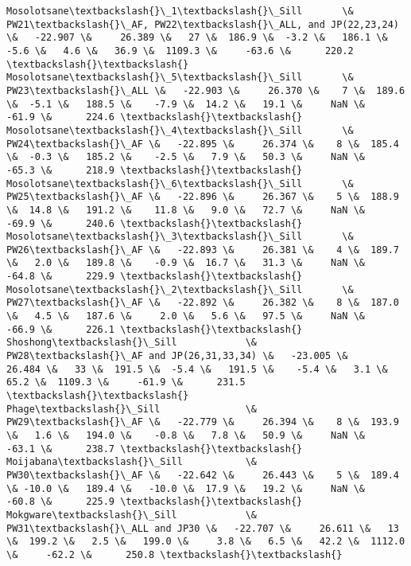 \documentclass{article}
\begin{document}
\begin{Verbatim}[commandchars=\\\{\}]
Mosolotsane\textbackslash{}\_1\textbackslash{}\_Sill       \&  PW21\textbackslash{}\_AF, PW22\textbackslash{}\_ALL, and JP(22,23,24) \&   -22.907 \&     26.389 \&   27 \&  186.9 \&  -3.2 \&   186.1 \&    -5.6 \&   4.6 \&   36.9 \&  1109.3 \&     -63.6 \&      220.2 \textbackslash{}\textbackslash{}
Mosolotsane\textbackslash{}\_5\textbackslash{}\_Sill       \&                             PW23\textbackslash{}\_ALL \&   -22.903 \&     26.370 \&    7 \&  189.6 \&  -5.1 \&   188.5 \&    -7.9 \&  14.2 \&   19.1 \&     NaN \&     -61.9 \&      224.6 \textbackslash{}\textbackslash{}
Mosolotsane\textbackslash{}\_4\textbackslash{}\_Sill       \&                              PW24\textbackslash{}\_AF \&   -22.895 \&     26.374 \&    8 \&  185.4 \&  -0.3 \&   185.2 \&    -2.5 \&   7.9 \&   50.3 \&     NaN \&     -65.3 \&      218.9 \textbackslash{}\textbackslash{}
Mosolotsane\textbackslash{}\_6\textbackslash{}\_Sill       \&                              PW25\textbackslash{}\_AF \&   -22.896 \&     26.367 \&    5 \&  188.9 \&  14.8 \&   191.2 \&    11.8 \&   9.0 \&   72.7 \&     NaN \&     -69.9 \&      240.6 \textbackslash{}\textbackslash{}
Mosolotsane\textbackslash{}\_3\textbackslash{}\_Sill       \&                              PW26\textbackslash{}\_AF \&   -22.893 \&     26.381 \&    4 \&  189.7 \&   2.0 \&   189.8 \&    -0.9 \&  16.7 \&   31.3 \&     NaN \&     -64.8 \&      229.9 \textbackslash{}\textbackslash{}
Mosolotsane\textbackslash{}\_2\textbackslash{}\_Sill       \&                              PW27\textbackslash{}\_AF \&   -22.892 \&     26.382 \&    8 \&  187.0 \&   4.5 \&   187.6 \&     2.0 \&   5.6 \&   97.5 \&     NaN \&     -66.9 \&      226.1 \textbackslash{}\textbackslash{}
Shoshong\textbackslash{}\_Sill            \&          PW28\textbackslash{}\_AF and JP(26,31,33,34) \&   -23.005 \&     26.484 \&   33 \&  191.5 \&  -5.4 \&   191.5 \&    -5.4 \&   3.1 \&   65.2 \&  1109.3 \&     -61.9 \&      231.5 \textbackslash{}\textbackslash{}
Phage\textbackslash{}\_Sill               \&                              PW29\textbackslash{}\_AF \&   -22.779 \&     26.394 \&    8 \&  193.9 \&   1.6 \&   194.0 \&    -0.8 \&   7.8 \&   50.9 \&     NaN \&     -63.1 \&      238.7 \textbackslash{}\textbackslash{}
Moijabana\textbackslash{}\_Sill           \&                              PW30\textbackslash{}\_AF \&   -22.642 \&     26.443 \&    5 \&  189.4 \& -10.0 \&   189.4 \&   -10.0 \&  17.9 \&   19.2 \&     NaN \&     -60.8 \&      225.9 \textbackslash{}\textbackslash{}
Mokgware\textbackslash{}\_Sill            \&                    PW31\textbackslash{}\_ALL and JP30 \&   -22.707 \&     26.611 \&   13 \&  199.2 \&   2.5 \&   199.0 \&     3.8 \&   6.5 \&   42.2 \&  1112.0 \&     -62.2 \&      250.8 \textbackslash{}\textbackslash{}

\end{Verbatim}
\end{document}
